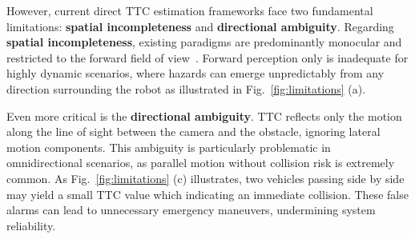 \documentclass[journal]{IEEEtran}
\begin{document}

However, current direct TTC estimation frameworks face two fundamental limitations: \textbf{spatial incompleteness} and \textbf{directional ambiguity}. Regarding \textbf{spatial incompleteness}, existing paradigms are predominantly monocular and restricted to the forward field of view~\cite{badki2021binaryttc,li2024fpttc}. Forward perception only is inadequate for highly dynamic scenarios, where hazards can emerge unpredictably from any direction surrounding the robot as illustrated in Fig.~\ref{fig:limitations} (a).

Even more critical is the \textbf{directional ambiguity}. TTC reflects only the motion along the line of sight between the camera and the obstacle, ignoring lateral motion components. This ambiguity is particularly problematic in omnidirectional scenarios, as parallel motion without collision risk is extremely common. 
As Fig.~\ref{fig:limitations} (c) illustrates, two vehicles passing side by side may yield a small TTC value which indicating an immediate collision. These false alarms can lead to unnecessary emergency maneuvers, undermining system reliability.
\end{document}
